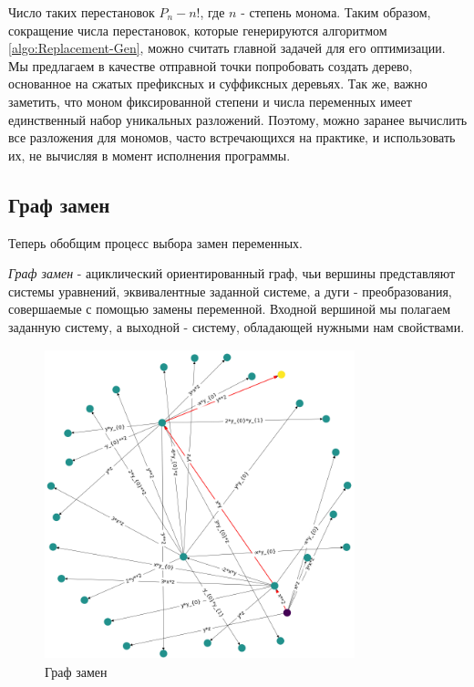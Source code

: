 Число таких перестановок $P_n - n!$, где $n$ - степень монома. Таким образом, сокращение числа перестановок, которые генерируются алгоритмом \ref{algo:Replacement-Gen}, можно считать главной задачей для его оптимизации. Мы предлагаем в качестве отправной точки попробовать создать дерево, основанное на сжатых префиксных и суффиксных деревьях. Так же, важно заметить, что моном фиксированной степени и числа переменных имеет единственный набор уникальных разложений. Поэтому, можно заранее вычислить все разложения для мономов, часто встречающихся на практике, и использовать их, не вычисляя в момент исполнения программы.

\subsection{Граф замен} \label{replacement-graph-section}

Теперь обобщим процесс выбора замен переменных.

\begin{definition}
    \textit{Граф замен} - ациклический ориентированный граф, чьи вершины представляют системы уравнений, эквивалентные заданной системе, а дуги - преобразования, совершаемые с помощью замены переменной. Входной вершиной мы полагаем заданную систему, а выходной - систему, обладающей нужными нам свойствами.
\end{definition}


\begin{figure}
\includegraphics[width=9cm,height=9cm]{chapters/images/replacement_graph.png} 
\caption{Граф замен}
\label{fig:replacement-graph}
\end{figure}

